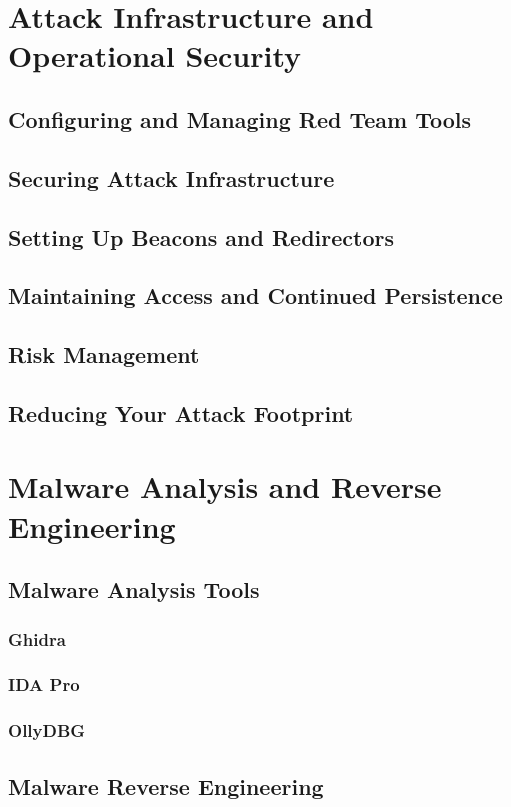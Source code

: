 \documentclass{article}
\begin{document}
\section{Attack Infrastructure and Operational Security}
\subsection{Configuring and Managing Red Team Tools}
\subsection{Securing Attack Infrastructure}
\subsection{Setting Up Beacons and Redirectors}
\subsection{Maintaining Access and Continued Persistence}
\subsection{Risk Management}
\subsection{Reducing Your Attack Footprint}
\section{Malware Analysis and Reverse Engineering}
\subsection{Malware Analysis Tools}
\subsubsection{Ghidra}
\subsubsection{IDA Pro}
\subsubsection{OllyDBG}
\subsection{Malware Reverse Engineering}
\end{document}
